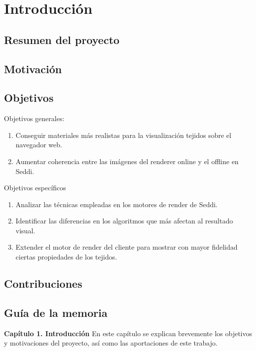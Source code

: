 \chapter{Introducci\'on}

\section{Resumen del proyecto}

\section{Motivaci\'on}

\section{Objetivos}
Objetivos generales:
\begin{enumerate}
    \item Conseguir materiales m\'as realistas para la visualizaci\'on tejidos sobre el navegador web.
    \item Aumentar coherencia entre las im\'agenes del renderer online y el offline en Seddi.
\end{enumerate}

Objetivos espec\'ificos
\begin{enumerate}
    \item Analizar las t\'ecnicas empleadas en los motores de render de Seddi. 
    \item Identificar las diferencias en los algoritmos que m\'as afectan al resultado visual.
    \item Extender el motor de render del cliente para mostrar con mayor fidelidad ciertas propiedades
          de los tejidos.
  \end{enumerate}

\section{Contribuciones}

\section{Gu\'ia de la memoria}

\textbf{Cap\'itulo 1. Introducci\'on}
En este cap\'itulo se explican brevemente los objetivos y motivaciones del proyecto, as\'i como las aportaciones
de este trabajo.\\

